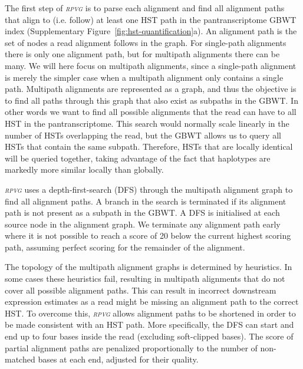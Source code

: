 \documentclass[11pt]{ucthesis}
\newcommand{\tool}[1]{\emph{\textsc{#1}}}
\begin{document}
The first step of \tool{rpvg} is to parse each alignment and find all alignment paths that align to (i.e. follow) at least one HST path in the pantranscriptome GBWT index (Supplementary Figure~\ref{fig:hst-quantification}a). An alignment path is the set of nodes a read alignment follows in the graph. For single-path alignments there is only one alignment path, but for multipath alignments there can be many. We will here focus on multipath alignments, since a single-path alignment is merely the simpler case when a multipath alignment only contains a single path. 
\newline 
\newline
Multipath alignments are represented as a graph, and thus the objective is to find all paths through this graph that also exist as subpaths in the GBWT. In other words we want to find all possible alignments that the read can have to all HST in the pantranscriptome. This search would normally scale linearly in the number of HSTs overlapping the read, but the GBWT allows us to query all HSTs that contain the same subpath. Therefore, HSTs that are locally identical will be queried together, taking advantage of the fact that haplotypes are markedly more similar locally than globally.  

\tool{rpvg} uses a depth-first-search (DFS) through the multipath alignment graph to find all alignment paths. A branch in the search is terminated if its alignment path is not present as a subpath in the GBWT. A DFS is initialised at each source node in the alignment graph. We terminate any alignment path early where it is not possible to reach a score of 20 below the current highest scoring path, assuming perfect scoring for the remainder of the alignment. 

The topology of the multipath alignment graphs is determined by heuristics. In some cases these heuristics fail, resulting in multipath alignments that do not cover all possible alignment paths. This can result in incorrect downstream expression estimates as a read might be missing an alignment path to the correct HST. To overcome this, \tool{rpvg} allows alignment paths to be shortened in order to be made consistent with an HST path. More specifically, the DFS can start and end up to four bases inside the read (excluding soft-clipped bases). The score of partial alignment paths are penalized proportionally to the number of non-matched bases at each end, adjusted for their quality. 
\end{document}
